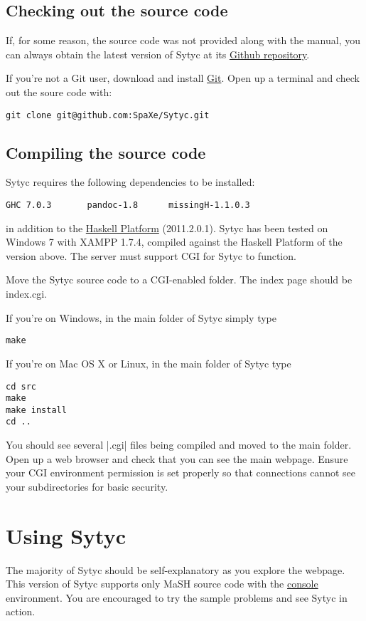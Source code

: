 \documentclass[a4paper]{article}
\begin{document}
\subsection{Checking out the source code}

If, for some reason, the source code was not provided along with the manual, you can always obtain the latest version of Sytyc at its  \href{https://github.com/SpaXe/Sytyc}{Github repository}.

If you're not a Git user, download and install \href{http://git-scm.com/}{Git}.  Open up a terminal and check out the soure code with:
\begin{verbatim}
git clone git@github.com:SpaXe/Sytyc.git
\end{verbatim}

\subsection{Compiling the source code}

Sytyc requires the following dependencies to be installed:
\begin{verbatim}
GHC 7.0.3       pandoc-1.8      missingH-1.1.0.3
\end{verbatim}
in addition to the \href{http://hackage.haskell.org/platform/}{Haskell Platform} (2011.2.0.1).  Sytyc has been tested on Windows 7 with XAMPP 1.7.4, compiled against the Haskell Platform of the version above.  The server must support CGI for Sytyc to function.

Move the Sytyc source code to a CGI-enabled folder.  The index page should be index.cgi.

If you're on Windows, in the main folder of Sytyc simply type
\begin{verbatim}
make
\end{verbatim}

If you're on Mac OS X or Linux, in the main folder of Sytyc type
\begin{verbatim}
cd src
make
make install
cd ..
\end{verbatim}

You should see several |.cgi| files being compiled and moved to the main folder.  Open up a web browser and check that you can see the main webpage.  Ensure your CGI environment permission is set properly so that connections cannot see your subdirectories for basic security.

\section{Using Sytyc}
The majority of Sytyc should be self-explanatory as you explore the webpage.  This version of Sytyc supports only MaSH source code with the \href{http://www.ict.griffith.edu.au/arock/MaSH/console.html}{console} environment.  You are encouraged to try the sample problems and see Sytyc in action.
\end{document}
